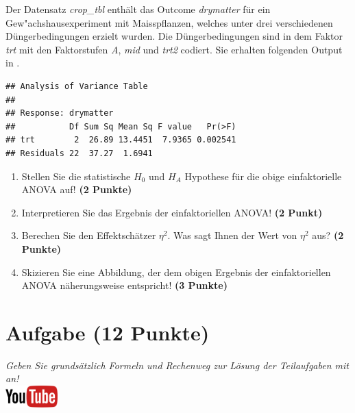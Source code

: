 \documentclass[a4paper, 9pt]{scrartcl}\usepackage[]{graphicx}\usepackage[]{xcolor}
\makeatletter
\newenvironment{kframe}{%
 \def\at@end@of@kframe{}%
 \ifinner\ifhmode%
  \def\at@end@of@kframe{\end{minipage}}%
  \begin{minipage}{\columnwidth}%
 \fi\fi%
 \def\FrameCommand##1{\hskip\@totalleftmargin \hskip-\fboxsep
 \colorbox{shadecolor}{##1}\hskip-\fboxsep
     \hskip-\linewidth \hskip-\@totalleftmargin \hskip\columnwidth}%
 \MakeFramed {\advance\hsize-\width
   \@totalleftmargin\z@ \linewidth\hsize
   \@setminipage}}%
 {\par\unskip\endMakeFramed%
 \at@end@of@kframe}
\newenvironment{knitrout}{}{} %
\makeatother
\begin{document}
Der Datensatz \textit{crop\_tbl} enth{\"a}lt das Outcome \textit{drymatter} f{\"u}r ein Gew{"a}chshausexperiment mit 
Maisspflanzen, welches unter drei 
verschiedenen D{\"u}ngerbedingungen erzielt wurden. Die D{\"u}ngerbedingungen sind in dem Faktor
\textit{trt} mit den Faktorstufen \textit{A},  \textit{mid} und
 \textit{trt2} codiert. Sie erhalten folgenden Output in \Rlogo.

\begin{knitrout}
\color{fgcolor}\begin{kframe}
\begin{verbatim}
## Analysis of Variance Table
## 
## Response: drymatter
##           Df Sum Sq Mean Sq F value   Pr(>F)
## trt        2  26.89 13.4451  7.9365 0.002541
## Residuals 22  37.27  1.6941
\end{verbatim}
\end{kframe}
\end{knitrout}

\begin{enumerate}
\item Stellen Sie die statistische $H_0$ und $H_A$ Hypothese f{\"u}r die obige
  einfaktorielle ANOVA auf! \textbf{(2 Punkte)}
\item Interpretieren Sie das Ergebnis der einfaktoriellen ANOVA! \textbf{(2 Punkt)} 
\item Berechen Sie den Effektsch{\"a}tzer $\eta^2$. Was sagt Ihnen der Wert von
  $\eta^2$ aus? \textbf{(2 Punkte)}
\item Skizieren Sie eine Abbildung, der dem obigen Ergebnis der
  einfaktoriellen ANOVA n{\"a}herungsweise entspricht! \textbf{(3 Punkte)}
\end{enumerate}

 
\clearpage

\section{Aufgabe \hfill (12 Punkte)}

\textit{Geben Sie grunds{\"a}tzlich Formeln und Rechenweg zur L{\"o}sung der
  Teilaufgaben mit an!} \\[1Ex]

\hfill\href{https://youtu.be/8Pb2sKUIMyk}{\includegraphics[width =
  2cm]{img/youtube}}\\[1Ex]
\end{document}
